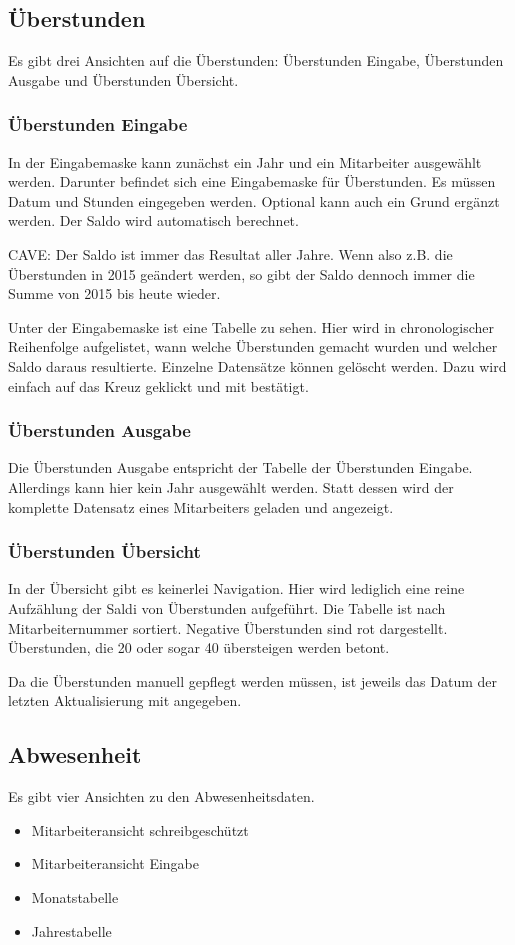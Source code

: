 \subsection{Überstunden}
Es gibt drei Ansichten auf die Überstunden: Überstunden Eingabe, Überstunden Ausgabe und Überstunden Übersicht.
\subsubsection{Überstunden Eingabe}
In der Eingabemaske kann zunächst ein Jahr und ein Mitarbeiter ausgewählt werden.
Darunter befindet sich eine Eingabemaske für Überstunden. Es müssen Datum und Stunden eingegeben werden. Optional kann auch ein Grund ergänzt werden. Der Saldo wird automatisch berechnet.

CAVE: Der Saldo ist immer das Resultat aller Jahre. Wenn also z.B. die Überstunden in 2015 geändert werden, so gibt der Saldo dennoch immer die Summe von 2015 bis heute wieder.

Unter der Eingabemaske ist eine Tabelle zu sehen. Hier wird in chronologischer Reihenfolge aufgelistet, wann welche Überstunden gemacht wurden und welcher Saldo daraus resultierte. Einzelne Datensätze können gelöscht werden. Dazu wird einfach auf das Kreuz  geklickt und mit  bestätigt.

\subsubsection{Überstunden Ausgabe}
Die Überstunden Ausgabe entspricht der Tabelle der Überstunden Eingabe. Allerdings kann hier kein Jahr ausgewählt werden. Statt dessen wird der komplette Datensatz eines Mitarbeiters geladen und angezeigt.


\subsubsection{Überstunden Übersicht}
In der Übersicht gibt es keinerlei Navigation. Hier wird lediglich eine reine Aufzählung der Saldi von Überstunden aufgeführt. Die Tabelle ist nach Mitarbeiternummer sortiert. Negative Überstunden sind rot dargestellt. Überstunden, die 20 oder sogar 40 übersteigen werden betont.

Da die Überstunden manuell gepflegt werden müssen, ist jeweils das Datum der letzten Aktualisierung mit angegeben.

\subsection{Abwesenheit}
Es gibt vier Ansichten zu den Abwesenheitsdaten.
\begin{itemize}
\item Mitarbeiteransicht schreibgeschützt
\item Mitarbeiteransicht Eingabe
\item Monatstabelle
\item Jahrestabelle
\end{itemize}
